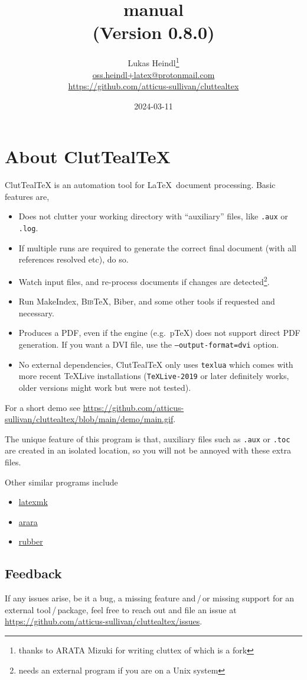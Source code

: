\documentclass[a4paper, 11pt]{scrartcl}
\title{\CluttealTeX manual\\(Version 0.8.0)} %
\author{%
	Lukas Heindl\thanks{thanks to ARATA Mizuki for writing cluttex of which \CluttealTeX is a fork}\\
	\url{oss.heindl+latex@protonmail.com} \\
	\url{https://github.com/atticus-sullivan/cluttealtex}
}
\date{2024-03-11} %
\let\TeXold\TeX
\newcommand\CluttealTeX{ClutTeal\TeX\xspace}
\providecommand\BibTeX{\textsc{Bib}\TeX\xspace}
\renewcommand\TeX{\TeXold\xspace}
\begin{document}
\maketitle
\tableofcontents

\section{About \CluttealTeX}
\CluttealTeX is an automation tool for \LaTeX\ document processing.
Basic features are,
\begin{itemize}
	\item Does not clutter your working directory with \enquote{auxiliary} files, like \texttt{.aux} or \texttt{.log}.
	\item If multiple runs are required to generate the correct final document (with all references resolved etc), do so.
	\item Watch input files, and re-process documents if changes are detected\footnote{needs an external program if you are on a Unix system}.
	\item Run MakeIndex, \BibTeX, Biber, and some other tools if requested and necessary.
	\item Produces a PDF, even if the engine (e.g.\ p\TeX) does not support direct PDF generation.
		If you want a DVI file, use the \texttt{--output-format=dvi} option.
	\item No external dependencies, \CluttealTeX only uses \texttt{texlua} which comes with more recent TeXLive installations (\texttt{TeXLive-2019} or later definitely works, older versions might work but were not tested).
\end{itemize}

For a short demo see \url{https://github.com/atticus-sullivan/cluttealtex/blob/main/demo/main.gif}.

The unique feature of this program is that, auxiliary files such as \texttt{.aux} or \texttt{.toc} are created in an isolated location, so you will not be annoyed with these extra files.

Other similar programs include
\begin{itemize}
	\item \href{https://ctan.org/pkg/latexmk/}{latexmk}
	\item \href{https://ctan.org/pkg/arara/}{arara}
	\item \href{https://gitlab.com/latex-rubber/rubber/}{rubber}
\end{itemize}

\subsection{Feedback}
If any issues arise, be it a bug, a missing feature and\,/\,or missing support for an external tool\,/\,package, feel free to reach out and file an issue at \url{https://github.com/atticus-sullivan/cluttealtex/issues}.
\end{document}
